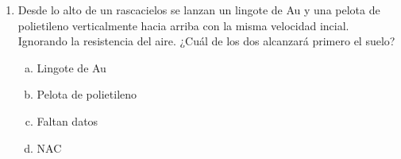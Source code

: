 \begin{multicols}{2}
\begin{enumerate}
	
	
	\item Desde lo alto de un rascacielos se lanzan un lingote de Au y una pelota de polietileno verticalmente hacia arriba con la misma velocidad incial. Ignorando la resistencia del aire. ¿Cuál de los dos alcanzará primero el suelo?
	\begin{enumerate}[a)]
		\item Lingote de Au
		\item Pelota de polietileno
		\item Faltan datos
		\item \colorbox[rgb]{1,1,0}{NAC}
	\end{enumerate}
	
\end{enumerate}
\end{multicols}

































